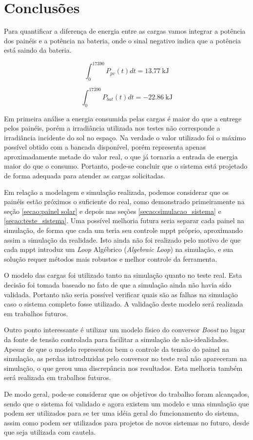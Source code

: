 \chapter{Conclusões} \label{secao:conclusoes}

Para quantificar a diferença de energia entre as cargas vamos integrar a potência dos painéis e a potência na bateria, onde o sinal negativo indica que a potência está saindo da bateria.

\begin{equation}
\int_{0}^{17390} P_{pv}(t) dt = \SI{13.77}{\kilo\joule}
\end{equation} 

\begin{equation}
\int_{0}^{17390} P_{bat}(t) dt = \SI{-22.86}{\kilo\joule}
\end{equation}

Em primeira análise a energia consumida pelas cargas é maior do que a entrege pelos painéis, porém a irradiância utilizada nos testes não corresponde a irradiância incidente do sol no espaço. Na verdade o valor utilizado foi o máximo possível obtido com a bancada disponível, porém representa apenas aproximadamente metade do valor real, o que já tornaria a entrada de energia maior do que o consumo. Portanto, pode-se concluir que o sistema está projetado de forma adequada para atender as cargas solicitadas.

Em relação a modelagem e simulação realizada, podemos considerar que os painéis estão próximos o suficiente do real, como demonstrado primeiramente na seção \ref{secao:painel solar} e depois nas seções \ref{secao:simulacao_sistema} e \ref{secao:teste_sistema}. Uma possível melhoria futura seria separar cada painel na simulação, de forma que cada um teria seu controle \gls{mppt} próprio, aproximando assim a simulação da realidade. Isto ainda não foi realizado pelo motivo de que cada \gls{mppt} introduz um \textit{Loop} Algébrico (\textit{Algebraic Loop}) na simulação, e sua solução requer métodos mais robustos e melhor controle da ferramenta.

O modelo das cargas foi utilizado tanto na simulação quanto no teste real. Esta decisão foi tomada baseado no fato de que a simulação ainda não havia sido validada. Portanto não seria possível verificar quais são as falhas na simulação caso o sistema completo fosse utilizado. A validação deste modelo será realizada em trabalhos futuros.

Outro ponto interessante é utilizar um modelo físico do conversor \textit{Boost} no lugar da fonte de tensão controlada para facilitar a simulação de não-idealidades. Apesar de que o modelo representou bem o controle da tensão do painel na simulação, as perdas introduzidas pelo conversor no teste real não apareceram na simulação, o que gerou uma discrepância nos resultados. Esta melhoria também será realizada em trabalhos futuros.

De modo geral, pode-se considerar que os objetivos do trabalho foram alcançados, sendo que o sistema foi validado e agora existem um modelo e uma simulação que podem ser utilizados para se ter uma idéia geral do funcionamento do sistema, assim como podem ser utilizados para projetos de novos sistemas no futuro, desde que seja utilizada com cautela.